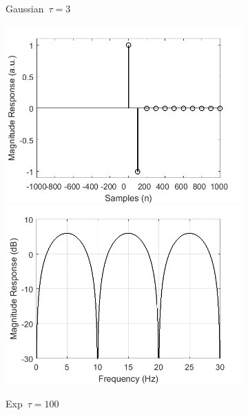 \documentclass[a4paper]{article}
\begin{document}
\begin{figure}[hbtp]
\begin{subfigure}{.16\textwidth}
        \caption{\scriptsize{Gaussian~$\tau=3$}}\label{fig:GaussKernel}
    \end{subfigure}
    \begin{subfigure}{.16\textwidth}
        \includegraphics[width=\textwidth]{img/tau/kernel_exp_100.png}\\
        \includegraphics[width=\textwidth]{img/tau/mag_exp_100.png}
        \caption{\scriptsize{Exp~$\tau=100$}}\label{fig:ExpTau100}
    \end{subfigure}
    \begin{subfigure}{.16\textwidth}

\end{subfigure}
\end{figure}
\end{document}
